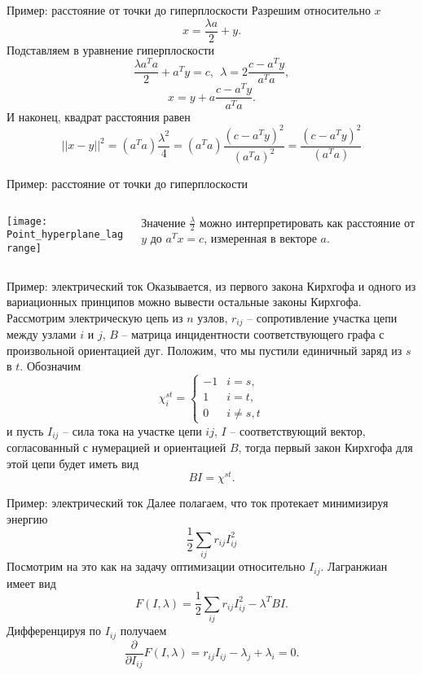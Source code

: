 \documentclass[10pt]{beamer}
\begin{document}
\begin{frame}{Пример: расстояние от точки до гиперплоскости}
Разрешим относительно $x$
$$
x=\frac{\lambda a}{2}+y.
$$
Подставляем в уравнение гиперплоскости
$$
\frac{\lambda a^Ta}{2}+a^Ty=c,~~
\lambda = 2\frac{c-a^Ty}{a^Ta},
$$
$$
x=y+a\frac{c-a^Ty}{a^Ta}.
$$
И наконец, квадрат расстояния равен
$$
||x-y||^2=(a^Ta) \frac{\lambda^2}{4}=(a^Ta)\frac{(c-a^Ty)^2}{(a^Ta)^2}=\frac{(c-a^Ty)^2}{(a^Ta)}
$$
\end{frame}

\begin{frame}{Пример: расстояние от точки до гиперплоскости}
\begin{columns}
\begin{column}{.45\textwidth}
\texttt{[image: Point\_hyperplane\_lagrange]}
\end{column}
\begin{column}{.5\textwidth}
Значение $\frac{\lambda}{2}$ можно интерпретировать как  расстояние от $y$ до $a^Tx=c$, измеренная в векторе $a$.
\end{column}
\end{columns}
\vspace{1em}

\end{frame}

\begin{frame}{Пример: электрический ток}
Оказывается, из первого закона Кирхгофа и одного из вариационных принципов можно вывести остальные законы Кирхгофа. Рассмотрим электрическую цепь из $n$ узлов, $r_{ij}$ -- сопротивление участка цепи между узлами $i$ и $j$, $B$ -- матрица инцидентности соответствующего графа с произвольной ориентацией дуг. Положим, что мы пустили единичный заряд из $s$ в $t$. Обозначим 
$$
\chi^{st}_i=\left\{\begin{array}{ll}
-1 & i = s,\\
1  & i = t,\\
0  & i\neq s,t
\end{array}\right.
$$ 
и пусть $I_{ij}$ -- сила тока на участке цепи $ij$, $I$ -- соответствующий вектор, согласованный с нумерацией и ориентацией $B$, тогда первый закон Кирхгофа для этой цепи будет иметь вид
$$
BI=\chi^{st}.
$$
\end{frame}

\begin{frame}{Пример: электрический ток}
Далее полагаем, что ток протекает минимизируя энергию
$$
\frac{1}{2}\sum_{ij}r_{ij}I^2_{ij}
$$
Посмотрим на это как на задачу оптимизации относительно  $I_{ij}$. Лагранжиан имеет вид
$$
F(I, \lambda)=\frac{1}{2}\sum_{ij}r_{ij}I^2_{ij}-\lambda^TBI.
$$
Дифференцируя по $I_{ij}$ получаем
$$
\frac{\partial}{\partial I_{ij}}F(I, \lambda)=r_{ij}I_{ij}-\lambda_j+\lambda_i=0.
$$
\end{frame}
\end{document}
